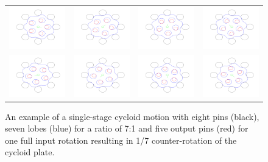 \begin{figure}[t]
   \centering
   \begin{tabular}{cccc}
     \includegraphics[width=0.24\linewidth]{fig/single_0} &
     \includegraphics[width=0.24\linewidth]{fig/single_1} &
     \includegraphics[width=0.24\linewidth]{fig/single_2} &
     \includegraphics[width=0.24\linewidth]{fig/single_3} \\
     \includegraphics[width=0.24\linewidth]{fig/single_4} &
     \includegraphics[width=0.24\linewidth]{fig/single_5} &
     \includegraphics[width=0.24\linewidth]{fig/single_6} &
     \includegraphics[width=0.24\linewidth]{fig/single_7} \\
   \end{tabular}
   \caption{An example of a single-stage cycloid motion with eight pins (black), seven lobes (blue) for a ratio of 7:1 and five output pins (red) for one full input rotation resulting in 1/7 counter-rotation of the cycloid plate.}
   \label{fig:single_motion}
\end{figure}

